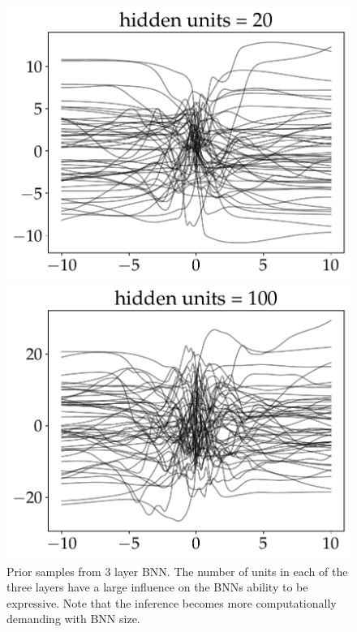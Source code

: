 \begin{figure}[H]
\begin{minipage}[b]{0.24\textwidth}
    \end{minipage}
    \hfill
    \begin{minipage}[b]{0.24\textwidth}
      \includegraphics[width=\textwidth]{Pictures/bayesian_nn_prior_samples_hidden_units_2.pdf}
    \end{minipage}
    \hfill
    \begin{minipage}[b]{0.24\textwidth}
      \includegraphics[width=\textwidth]{Pictures/bayesian_nn_prior_samples_hidden_units_3.pdf}
    \end{minipage}
    
    \caption{Prior samples from 3 layer BNN. The number of units in each of the three layers have a
    large influence on the BNNs ability to be expressive. Note that the inference becomes more
    computationally demanding with BNN size.}
    \label{n_unit_BNN}
  \end{figure}

